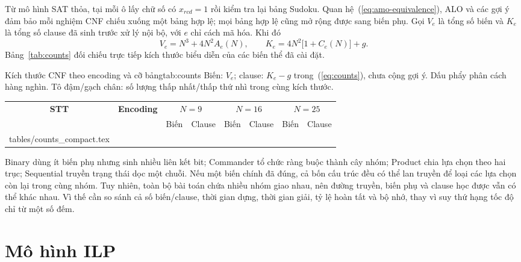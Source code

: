\documentclass[a4paper]{cas-sc}
\makeatletter
\newcommand{\tableinput}[1]{\@@input #1 }
\makeatother
\begin{document}
Từ mô hình SAT thỏa, tại mỗi ô lấy chữ số có $x_{rcd}=1$ rồi kiểm tra lại bảng Sudoku. Quan hệ~(\ref{eq:amo-equivalence}), ALO và các gợi ý đảm bảo mỗi nghiệm CNF chiếu xuống một bảng hợp lệ; mọi bảng hợp lệ cũng mở rộng được sang biến phụ. Gọi $V_e$ là tổng số biến và $K_e$ là tổng số clause đã sinh trước xử lý nội bộ, với $e$ chỉ cách mã hóa. Khi đó
\begin{equation}\label{eq:counts}
V_e=N^3+4N^2A_e(N),\qquad
K_e=4N^2\bigl[1+C_e(N)\bigr]+g.
\end{equation}
Bảng~\ref{tab:counts} đối chiếu trực tiếp kích thước biểu diễn của các biến thể đã cài đặt.

\begin{reporttable}{Kích thước CNF theo encoding và cỡ bảng}{tab:counts}{%
Biến: $V_e$; clause: $K_e-g$ trong~(\ref{eq:counts}), chưa cộng gợi ý. Dấu phẩy phân cách hàng nghìn. Tô đậm/gạch chân: số lượng thấp nhất/thấp thứ nhì trong cùng kích thước.}
\begin{tabular}{|c|l|c|c|c|c|c|c|}
\hline
\multirow{2}{*}{\textbf{STT}} & \multirow{2}{*}{\textbf{Encoding}} & \multicolumn{2}{c|}{$N=9$} & \multicolumn{2}{c|}{$N=16$} & \multicolumn{2}{c|}{$N=25$}\\\cline{3-8}
& & Biến & Clause & Biến & Clause & Biến & Clause\\\hline
\tableinput{tables/counts_compact.tex}\hline
\end{tabular}
\end{reporttable}

Binary dùng ít biến phụ nhưng sinh nhiều liên kết bit; Commander tổ chức ràng buộc thành cây nhóm; Product chia lựa chọn theo hai trục; Sequential truyền trạng thái dọc một chuỗi. Nếu một biến chính đã đúng, cả bốn cấu trúc đều có thể lan truyền để loại các lựa chọn còn lại trong cùng nhóm. Tuy nhiên, toàn bộ bài toán chứa nhiều nhóm giao nhau, nên đường truyền, biến phụ và clause học được vẫn có thể khác nhau. Vì thế cần so sánh cả số biến/clause, thời gian dựng, thời gian giải, tỷ lệ hoàn tất và bộ nhớ, thay vì suy thứ hạng tốc độ chỉ từ một số đếm.

\section{Mô hình ILP}
\end{document}
